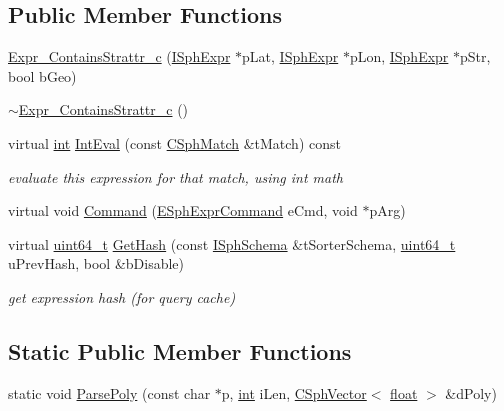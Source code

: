 \subsection*{Public Member Functions}
\begin{DoxyCompactItemize}
\item 
\hyperlink{classExpr__ContainsStrattr__c_af35f9f66f92a5a2ae32cfa8210b0077f}{Expr\-\_\-\-Contains\-Strattr\-\_\-c} (\hyperlink{structISphExpr}{I\-Sph\-Expr} $\ast$p\-Lat, \hyperlink{structISphExpr}{I\-Sph\-Expr} $\ast$p\-Lon, \hyperlink{structISphExpr}{I\-Sph\-Expr} $\ast$p\-Str, bool b\-Geo)
\item 
\hyperlink{classExpr__ContainsStrattr__c_afb107935191fd96fff70c44cd5ada2b4}{$\sim$\-Expr\-\_\-\-Contains\-Strattr\-\_\-c} ()
\item 
virtual \hyperlink{sphinxexpr_8cpp_a4a26e8f9cb8b736e0c4cbf4d16de985e}{int} \hyperlink{classExpr__ContainsStrattr__c_af9fbc12247df66d816752c8b0662a902}{Int\-Eval} (const \hyperlink{classCSphMatch}{C\-Sph\-Match} \&t\-Match) const 
\begin{DoxyCompactList}\small\item\em evaluate this expression for that match, using int math \end{DoxyCompactList}\item 
virtual void \hyperlink{classExpr__ContainsStrattr__c_a36a58f89fc4aa77e52eb96641c510b03}{Command} (\hyperlink{sphinxexpr_8h_a30be184fb07bd80c271360fc6094c818}{E\-Sph\-Expr\-Command} e\-Cmd, void $\ast$p\-Arg)
\item 
virtual \hyperlink{sphinxstd_8h_aaa5d1cd013383c889537491c3cfd9aad}{uint64\-\_\-t} \hyperlink{classExpr__ContainsStrattr__c_ade70407288b00654c9660ccedb8c37d3}{Get\-Hash} (const \hyperlink{classISphSchema}{I\-Sph\-Schema} \&t\-Sorter\-Schema, \hyperlink{sphinxstd_8h_aaa5d1cd013383c889537491c3cfd9aad}{uint64\-\_\-t} u\-Prev\-Hash, bool \&b\-Disable)
\begin{DoxyCompactList}\small\item\em get expression hash (for query cache) \end{DoxyCompactList}\end{DoxyCompactItemize}
\subsection*{Static Public Member Functions}
\begin{DoxyCompactItemize}
\item 
static void \hyperlink{classExpr__ContainsStrattr__c_a163f332341d1b453895031b29e375fc4}{Parse\-Poly} (const char $\ast$p, \hyperlink{sphinxexpr_8cpp_a4a26e8f9cb8b736e0c4cbf4d16de985e}{int} i\-Len, \hyperlink{classCSphVector}{C\-Sph\-Vector}$<$ \hyperlink{sphinxexpr_8cpp_a0e0d0739f7035f18f949c2db2c6759ec}{float} $>$ \&d\-Poly)
\end{DoxyCompactItemize}
